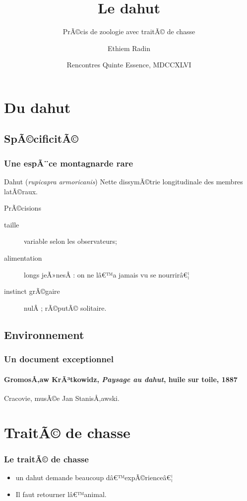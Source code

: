 \documentclass{beamer}
\title{Le dahut}
\subtitle{PrÃ©cis de zoologie avec traitÃ© de chasse}
\author[Radin]{Ethiem Radin}
\institute[Univ. GÃ©vaudan]{UFR de Biologie\\ UniversitÃ© du GÃ©vaudan}
\date[MDCCXLVI]{Rencontres Quinte Essence, MDCCXLVI}
\begin{document}
\begin{frame}
  \titlepage
  \tableofcontents
\end{frame}

\section{Du dahut}
\subsection{SpÃ©cificitÃ©}

\begin{frame}
  \frametitle{Une espÃ¨ce montagnarde rare}

  \begin{block}{Dahut (\emph{rupicapra armoricanis})}
     Nette dissymÃ©trie longitudinale des membres latÃ©raux.
  \end{block}
  \begin{exampleblock}{PrÃ©cisions}
    \begin{description}
       \item[taille] variable selon les observateurs;
       \item[alimentation] longs jeÃ»nesÂ : on ne lâ€™a jamais vu se nourrirâ€¦
       \item[instinct grÃ©gaire] nulÂ ; rÃ©putÃ© solitaire.
    \end{description}
  \end{exampleblock}
\end{frame}

\subsection{Environnement}


\begin{frame}
   \frametitle{Un document exceptionnel}
   \framesubtitle{GromosÅ‚aw KrÃ³tkowidz, \emph{Paysage au dahut}, huile sur toile, 1887}

   Cracovie, musÃ©e Jan StanisÅ‚awski.
\end{frame}

\section{TraitÃ© de chasse}

\begin{frame}
   \frametitle{Le traitÃ© de chasse}
   
   \begin{itemize}
      \item {} un dahut demande \alert{beaucoup dâ€™expÃ©rience}â€¦ 
      \item Il faut retourner lâ€™animal.
   \end{itemize}
\end{frame}
\end{document}

